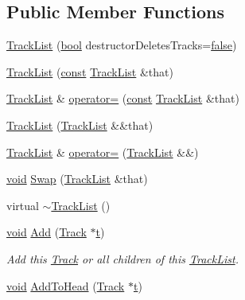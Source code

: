 \subsection*{Public Member Functions}
\begin{DoxyCompactItemize}
\item 
\hyperlink{class_track_list_a36c59978bc76cbf1de77e277087dfceb}{Track\+List} (\hyperlink{mac_2config_2i386_2lib-src_2libsoxr_2soxr-config_8h_abb452686968e48b67397da5f97445f5b}{bool} destructor\+Deletes\+Tracks=\hyperlink{mac_2config_2i386_2lib-src_2libsoxr_2soxr-config_8h_a65e9886d74aaee76545e83dd09011727}{false})
\item 
\hyperlink{class_track_list_ae3b076cf308eb2d5db54f6bb2d91bb55}{Track\+List} (\hyperlink{getopt1_8c_a2c212835823e3c54a8ab6d95c652660e}{const} \hyperlink{class_track_list}{Track\+List} \&that)
\item 
\hyperlink{class_track_list}{Track\+List} \& \hyperlink{class_track_list_a6de22801840ee9c260fc29713a1d54e7}{operator=} (\hyperlink{getopt1_8c_a2c212835823e3c54a8ab6d95c652660e}{const} \hyperlink{class_track_list}{Track\+List} \&that)
\item 
\hyperlink{class_track_list_a25030eac934787bfdca1a79c42a1fd00}{Track\+List} (\hyperlink{class_track_list}{Track\+List} \&\&that)
\item 
\hyperlink{class_track_list}{Track\+List} \& \hyperlink{class_track_list_aec1e6d0d3566a07dbf6d02d78513158f}{operator=} (\hyperlink{class_track_list}{Track\+List} \&\&)
\item 
\hyperlink{sound_8c_ae35f5844602719cf66324f4de2a658b3}{void} \hyperlink{class_track_list_a7d02a7f59211a43dba6d804f40be75c7}{Swap} (\hyperlink{class_track_list}{Track\+List} \&that)
\item 
virtual \hyperlink{class_track_list_ae16147edd4a2f022b3c0d1dfbac2eab0}{$\sim$\+Track\+List} ()
\item 
\hyperlink{sound_8c_ae35f5844602719cf66324f4de2a658b3}{void} \hyperlink{class_track_list_a58714973bb20a5a2cff2c839db9d3117}{Add} (\hyperlink{class_track}{Track} $\ast$\hyperlink{octave__test_8m_aaccc9105df5383111407fd5b41255e23}{t})
\begin{DoxyCompactList}\small\item\em Add this \hyperlink{class_track}{Track} or all children of this \hyperlink{class_track_list}{Track\+List}. \end{DoxyCompactList}\item 
\hyperlink{sound_8c_ae35f5844602719cf66324f4de2a658b3}{void} \hyperlink{class_track_list_a5d69082a9b198430c88a35866cfeac9f}{Add\+To\+Head} (\hyperlink{class_track}{Track} $\ast$\hyperlink{octave__test_8m_aaccc9105df5383111407fd5b41255e23}{t})

\end{DoxyCompactItemize}
